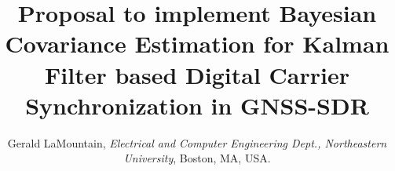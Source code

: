 \documentclass{NSF}
\newcommand{\comment}[1] {{\color{red}$\blacktriangleright${#1}$\blacktriangleleft$}}
\begin{document}

\title{Proposal to implement Bayesian Covariance Estimation for Kalman Filter based Digital Carrier Synchronization in GNSS-SDR}
\author{Gerald LaMountain, \textit{Electrical and Computer Engineering Dept., Northeastern University}, Boston, MA, USA.}







\renewcommand\refname{References Cited}








% 

% 

% 


\end{document}
